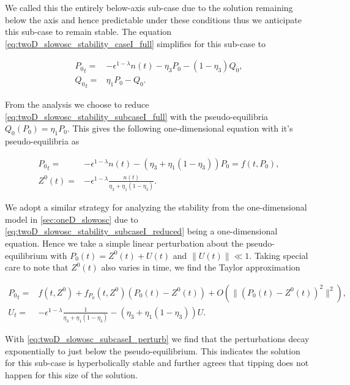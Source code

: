 We called this the entirely below-axis sub-case due to the solution remaining below the axis and hence predictable under these conditions thus we anticipate this sub-case to remain stable. The equation \eqref{eq:twoD_slowosc_stability_caseI_full} simplifies for this sub-case to

\begin{equation}\label{eq:twoD_slowosc_stability_subcaseI_full}
\begin{aligned}
{P_0}_t =& -\epsilon^{1-\lambda} n(t)-\eta_3 P_0 -(1-\eta_3)Q_0,\\
{Q_0}_t =& \eta_1 P_0 - Q_0.
\end{aligned}
\end{equation}

From the analysis we choose to reduce \eqref{eq:twoD_slowosc_stability_subcaseI_full} with the pseudo-equilibria $Q_0(P_0)=\eta_1 P_0$. This gives the following one-dimensional equation with it's pseudo-equilibria as 

\begin{equation}\label{eq:twoD_slowosc_stability_subcaseI_reduced}
\begin{aligned}
{P_0}_t =& -\epsilon^{1-\lambda}n(t)-(\eta_3+\eta_1(1-\eta_3))P_0=f(t,P_0),\\ Z^0(t) =& -\epsilon^{1-\lambda}\frac{n(t)}{\eta_3+\eta_1(1-\eta_3)}.
\end{aligned}
\end{equation}

We adopt a similar strategy for analyzing the stability from the one-dimensional model in \autoref{sec:oneD_slowosc} due to \eqref{eq:twoD_slowosc_stability_subcaseI_reduced} being a one-dimensional equation. Hence we take a simple linear perturbation about the pseudo-equilibrium with $P_0(t)=Z^0(t)+U(t)$ and $\lVert U(t)\rVert \ll 1$. Taking special care to note that $Z^0(t)$ also varies in time, we find the Taylor approximation

\begin{equation}\label{eq:twoD_slowosc_subcaseI_perturb}
\begin{aligned}
{P_0}_t=&f(t,Z^0) +f_{P_0}(t,Z^0)(P_0(t)-Z^0(t))+O(\lVert (P_0(t)-Z^0(t))^2\rVert^2),\\
U_t =& -\epsilon^{1-\lambda}\frac{1}{\eta_3+\eta_1(1-\eta_3)}-(\eta_3+\eta_1(1-\eta_3))U.
\end{aligned}
\end{equation}

With \eqref{eq:twoD_slowosc_subcaseI_perturb} we find that the perturbations decay exponentially to just below the pseudo-equilibrium. This indicates the solution for this sub-case is hyperbolically stable and further agrees that tipping does not happen for this size of the solution.

